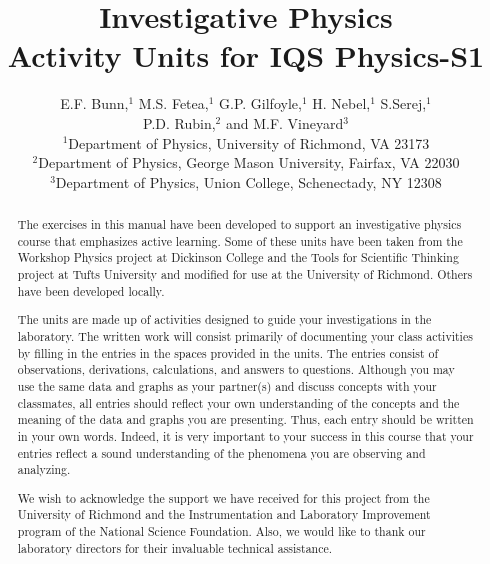 \documentclass[twoside]{article}
\begin{document}
\title{Investigative Physics\\ Activity Units for IQS Physics-S1}


\author{E.F. Bunn,$^1$ M.S. Fetea,$^1$
G.P. Gilfoyle,$^1$ H. Nebel,$^1$ S.Serej,$^1$ \\ P.D. Rubin,$^2$ and M.F. Vineyard$^3$\\[8pt]
$^1$Department of Physics, University of Richmond, VA 23173 \\[4pt]
$^2$Department of Physics, George Mason University, Fairfax, VA  22030 \\[4pt]
$^3$Department of Physics, Union College, Schenectady, NY 12308}

\maketitle
\begin{abstract}
The exercises in this manual have been developed to support an investigative
physics course that emphasizes active learning. Some of these units have been
taken from the Workshop Physics project at Dickinson College and the Tools for
Scientific Thinking project at Tufts University and modified for use at the
University of Richmond. Others have been developed locally.

The units are made up of activities designed to guide your investigations in
the laboratory. The written work will consist primarily of documenting your
class activities by filling in the entries in the spaces provided in the units.
The entries consist of observations, derivations, calculations, and answers
to questions. Although you may use the same data and graphs as your partner(s)
and discuss concepts with your classmates, all entries should reflect your own
understanding of the concepts and the meaning of the data and graphs you are
presenting. Thus, each entry should be written in your own words. Indeed, it
is very important to your success in this course that your entries reflect a
sound understanding of the phenomena you are observing and analyzing.

We wish to acknowledge the support we have received for this project from the
University of Richmond and the Instrumentation and Laboratory Improvement program 
of the National Science Foundation. Also, we would like to thank our laboratory 
directors for their invaluable technical assistance.
\end{abstract}
\end{document}
